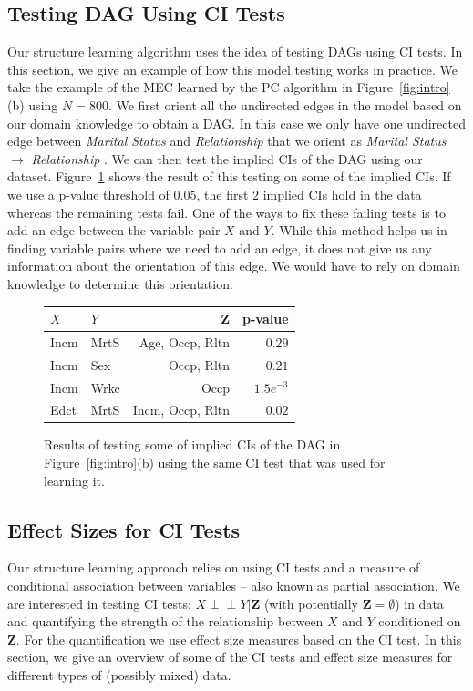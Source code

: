 \documentclass{uai2025} %
\def\ci{\perp\!\!\!\!\!\perp}
\begin{document}
\subsection{Testing DAG Using CI Tests}
Our structure learning algorithm uses the idea of testing DAGs using CI tests.
In this section, we give an example of how this model testing works in
practice. We take the example of the MEC learned by the PC algorithm in
Figure~\ref{fig:intro}(b) using $ N=800 $. We first orient all the undirected
edges in the model based on our domain knowledge to obtain a DAG. In this case
we only have one undirected edge between \emph{Marital Status} and
\emph{Relationship} that we orient as \emph{Marital Status} $ \rightarrow $
\emph{Relationship} . We can then test the implied CIs of the DAG using our
dataset. Figure~\ref{fig:ci_table} shows the result of this testing on some of
the implied CIs. If we use a p-value threshold of $ 0.05 $, the first $ 2 $
implied CIs hold in the data whereas the remaining tests fail. One of the ways
to fix these failing tests is to add an edge between the variable pair $ X $
and $ Y $. While this method helps us in finding variable pairs where we need
to add an edge, it does not give us any information about the orientation of
this edge. We would have to rely on domain knowledge to determine this
orientation.

\begin{figure}
	\centering
	\begin{tabular}{llrr}
		$X$ & $Y$ & $ \bm{Z} $ & p-value \\
		\hline
		Incm & MrtS &  Age, Occp, Rltn & $ 0.29 $     \\
		Incm & Sex  &  Occp, Rltn      & $ 0.21 $     \\
		Incm & Wrkc &  Occp 	       & $ 1.5e^{-3} $ \\
		Edct & MrtS & Incm, Occp, Rltn & $ 0.02 $       \\
		\hline
	\end{tabular}
	\caption{Results of testing some of implied CIs of the DAG in
		 Figure~\ref{fig:intro}(b) using the same CI test that was used for
		 learning it.}
	\label{fig:ci_table}
\end{figure}

\subsection{Effect Sizes for CI Tests}
\label{sec:ci_tests}

Our structure learning approach relies on using CI tests and a measure of
conditional association between variables -- also known as partial association.
We are interested in testing CI tests: $ X \ci Y \rvert \bm{Z} $ (with
potentially $ \bm{Z} = \emptyset $) in data and quantifying the strength of the
relationship between $ X $ and $ Y $ conditioned on $ \bm{Z} $. For the
quantification we use effect size measures based on the CI test. In this
section, we give an overview of some of the CI tests and effect size measures
for different types of (possibly mixed) data.
\end{document}
